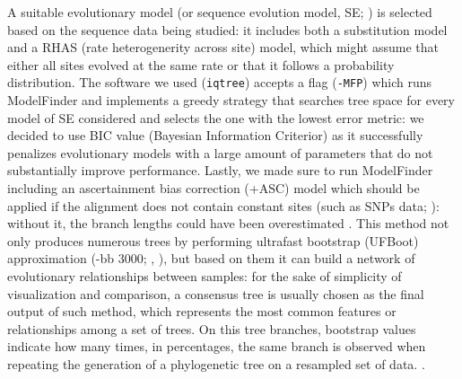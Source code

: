 \documentclass[a4paper, 12pt]{report}
\begin{document}
\begin{description}
	A suitable evolutionary model (or sequence evolution model, SE; \cite{kalyaanamoorthyModelFinderFastModel2017}) is selected based on the sequence data being studied: it includes both a substitution model and a RHAS (rate heterogenerity across site) model, which might assume that either all sites evolved at the same rate or that it follows a probability distribution. The software we used (\texttt{iqtree}) accepts a flag (\texttt{-MFP}) which runs ModelFinder \parencite{kalyaanamoorthyModelFinderFastModel2017} and implements a greedy strategy that searches tree space for every model of SE considered and selects the one with the lowest error metric: we decided to use BIC value (Bayesian Information Criterior) as it successfully penalizes evolutionary models with a large amount of parameters that do not substantially improve performance. Lastly, we made sure to run ModelFinder including an ascertainment bias correction (+ASC) model which should be applied if the alignment does not contain constant sites (such as SNPs data; \cite{lewisLikelihoodApproachEstimating2001}): without it, the branch lengths could have been overestimated \parencite{wongIQTREE3Phylogenomic2025}. This method not only produces numerous trees by performing ultrafast bootstrap (UFBoot) approximation  (-bb 3000; \cite{minhUltrafastApproximationPhylogenetic2013}, \cite{hoangUFBoot2ImprovingUltrafast2018}), but based on them it can build a network of evolutionary relationships between samples: for the sake of simplicity of visualization and comparison, a consensus tree is usually chosen as the final output of such method, which represents the most common features or relationships among a set of trees. On this tree branches, bootstrap values indicate how many times, in percentages, the same branch is observed when repeating the generation of a phylogenetic tree on a resampled set of data. \parencite{ojhaChapter5Computational2022a}.
\end{description}
\vspace{-1.5em}
\end{document}
